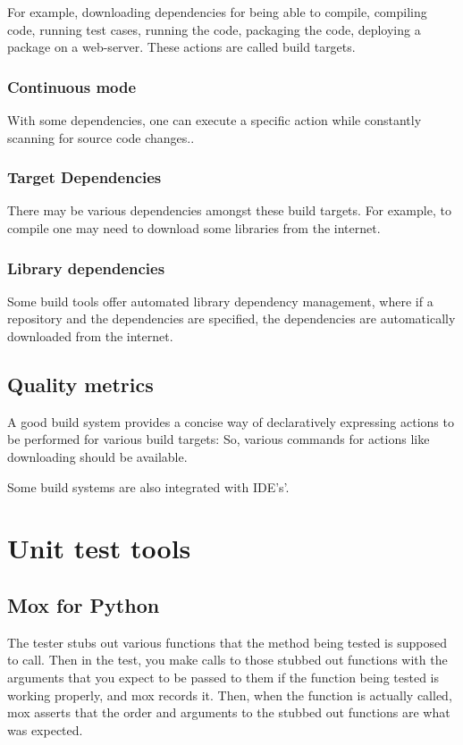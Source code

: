 \documentclass[oneside, article]{memoir}
\begin{document}
For example, downloading dependencies for being able to compile, compiling code, running test cases, running the code, packaging the code, deploying a package on a web-server. These actions are called build targets.

\subsection{Continuous mode}
With some dependencies, one can execute a specific action while constantly scanning for source code changes..

\subsection{Target Dependencies}
There may be various dependencies amongst these build targets. For example, to compile one may need to download some libraries from the internet.

\subsection{Library dependencies}
Some build tools offer automated library dependency management, where if a repository and the dependencies are specified, the dependencies are automatically downloaded from the internet.

\section{Quality metrics}
A good build system provides a concise way of declaratively expressing actions to be performed for various build targets: So, various commands for actions like downloading should be available.

Some build systems are also integrated with IDE's'.

\chapter{Unit test tools}
\section{Mox for Python}
The tester stubs out various functions that the method being tested is supposed to call. Then in the test, you make calls to those stubbed out functions with the arguments that you expect to be passed to them if the function being tested is working properly, and mox records it. Then, when the function is actually called, mox asserts that the order and arguments to the stubbed out functions are what was expected. 
\end{document}
